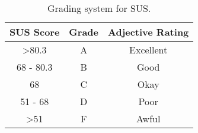 \begin{table}[ht]
    \centering
    \begin{tabular}{ |c|c|c| } 
        \hline
        \rowcolor{light-gray}
        SUS Score & Grade & Adjective Rating\\
        \hline
        >80.3 & A & Excellent \\ 
        \hline
        68 - 80.3 & B & Good \\ 
        \hline
        68 & C & Okay \\ 
        \hline
        51 - 68 & D & Poor \\
        \hline
        >51 & F & Awful \\
        \hline
    \end{tabular}
    \caption{\label{tab:sus-grading}Grading system for SUS.}
\end{table}